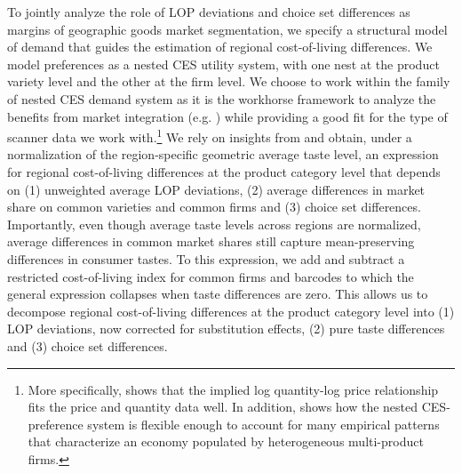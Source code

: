 To jointly analyze the role of LOP deviations and choice set differences as margins of geographic goods market segmentation, we specify a structural model of demand that guides the estimation of regional cost-of-living differences. We model preferences as a nested CES utility system, with one nest at the product variety level and the other at the firm level. We choose to work within the family of nested CES demand system as it is the workhorse framework to analyze the benefits from market integration (e.g. \citet{Arkolakis2012}) while providing a good fit for the type of scanner data we work with.\footnote{More specifically, \citet{Dellavigna2019} shows that the implied log quantity-log price relationship fits the price and quantity data well. In addition, \citet{Hottman2016} shows how the nested CES-preference system is flexible enough to account for many empirical patterns that characterize an economy populated by heterogeneous multi-product firms.} We rely on insights from \citet{Redding2020} and obtain, under a normalization of the region-specific geometric average taste level, an expression for regional cost-of-living differences at the product category level that depends on (1) unweighted average LOP deviations, (2) average differences in market share on common varieties and common firms and (3) choice set differences. Importantly, even though average taste levels across regions are normalized, average differences in common market shares still capture mean-preserving differences in consumer tastes. To this expression, we add and subtract a restricted cost-of-living index for common firms and barcodes to which the general expression collapses when taste differences are zero. This allows us to decompose regional cost-of-living differences at the product category level into (1) LOP deviations, now corrected for substitution effects, (2) pure taste differences and (3) choice set differences. 

